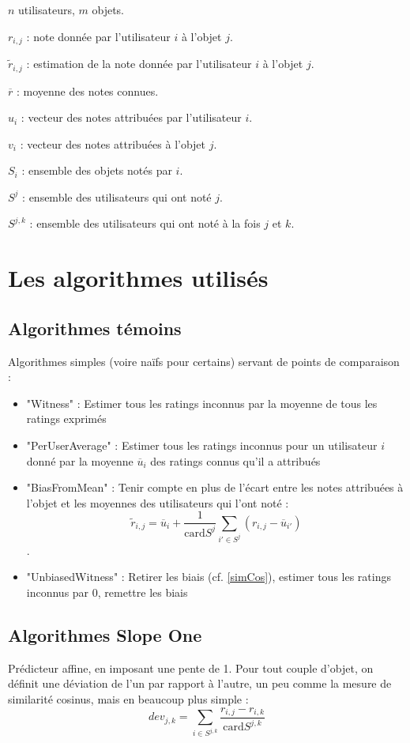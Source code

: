 \documentclass[11pt, openany, a4paper]{article}
\newcommand{\card}{\mathrm{card}}
\begin{document}
$n$ utilisateurs, $m$ objets.

$r_{i,j}$ : note donnée par l'utilisateur $i$ à l'objet $j$.

$\tilde r_{i,j}$ : estimation de la note donnée par l'utilisateur $i$ à l'objet $j$.

$\overline r$ : moyenne des notes connues.

$u_i$ : vecteur des notes attribuées par l'utilisateur $i$.

$v_i$ : vecteur des notes attribuées à l'objet $j$.

$S_i$ : ensemble des objets notés par $i$.

$S^j$ : ensemble des utilisateurs qui ont noté $j$.

$S^{j,k}$ : ensemble des utilisateurs qui ont noté à la fois $j$ et $k$.

\section{Les algorithmes utilisés}
	\subsection{Algorithmes témoins}
		Algorithmes simples (voire naïfs pour certains) servant de points de comparaison : 
			\begin{itemize}
				\item{"Witness" : Estimer tous les ratings inconnus par la moyenne de tous les ratings exprimés}
				\item{"PerUserAverage" : Estimer tous les ratings inconnus pour un utilisateur $i$ donné par la moyenne $\overline u_i$ des ratings connus qu'il a attribués}
				\item{"BiasFromMean" : Tenir compte en plus de l'écart entre les notes attribuées à l'objet et les moyennes des utilisateurs qui l'ont noté : 
				$$\tilde r_{i,j}=\overline u_i + \frac{1}{\card S^j} \sum\limits_{i'\in S^j} (r_{i,j} - \overline u_{i'})$$.}
				\item{"UnbiasedWitness" : Retirer les biais (cf. \ref{simCos}), estimer tous les ratings inconnus par $0$, remettre les biais}
			\end{itemize}
	
	\subsection{Algorithmes Slope One}
		Prédicteur affine, en imposant une pente de 1. Pour tout couple d'objet, on définit une déviation de l'un par rapport à l'autre, un peu comme la mesure de similarité cosinus, mais en beaucoup plus simple :
		$$dev_{j,k} = \sum\limits_{i\in S^{j,k}}
		\frac{r_{i,j}-r_{i,k}}{\card S^{j,k}}$$
		
\end{document}
